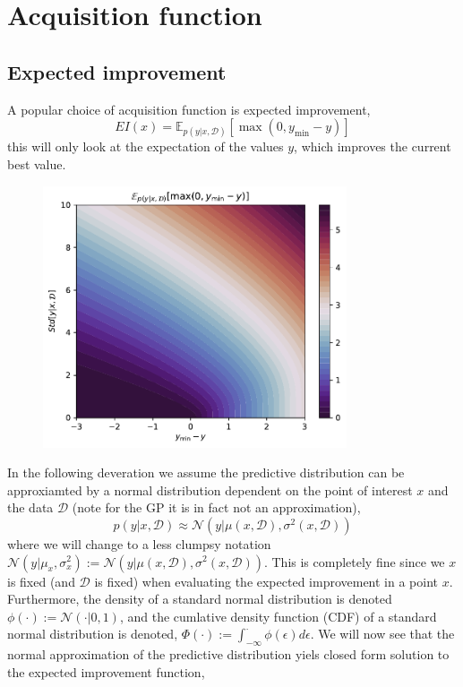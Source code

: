 \section{Acquisition function}

\subsection{Expected improvement}
A popular choice of acquisition function is expected improvement, 
$$EI(x) = \mathbb{E}_{p(y|x,\mathcal{D})}[\max(0, y_{\min}-y)]$$
this will only look at the expectation of the values $y$, which improves the current best value.

\begin{figure}[H]
    \centering
    \includegraphics[width=0.8\textwidth]{Pictures/expected_improvement_illustration.pdf}
\end{figure}

In the following deveration
we assume the predictive distribution can be approxiamted by a normal distribution dependent on
the point of interest $x$ and the data $\mathcal{D}$ (note for the GP
it is in fact not an approximation), 
$$p(y|x,\mathcal{D}) \approx \mathcal{N}(y|\mu(x,\mathcal{D}), \sigma^2(x,\mathcal{D}))$$ where we
will change to a less clumpsy notation $\mathcal{N}(y|\mu_x,
\sigma^2_x):=\mathcal{N}(y|\mu(x,\mathcal{D}), \sigma^2(x,\mathcal{D}))$. This is completely fine
since we $x$ is fixed (and $\mathcal{D}$ is fixed) when evaluating the expected improvement in a point
$x$. %
Furthermore, the density of
a standard normal distribution is denoted $\phi(\cdot):=\mathcal{N}(\cdot | 0,1)$, and the cumlative
density function (CDF) of a standard normal distribution is denoted, $\Phi(\cdot) :=
\int_{-\infty}^{\cdot} \phi(\epsilon)d\epsilon$. We will now see that the normal approximation
of the predictive distribution yiels closed form solution to the expected improvement function, 

